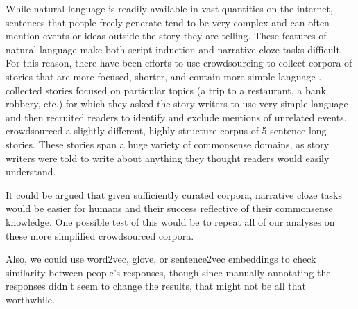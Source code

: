 \documentclass[10pt,a4paper]{article}
\newcommand{\todo}[1]{{\color{red}#1}}
\begin{document}
While natural language is readily available in vast quantities on the internet, sentences that people freely generate tend to be very complex and can often mention events or ideas outside the story they are telling. These features of natural language make both script induction and narrative cloze tasks difficult. For this reason, there have been efforts to use crowdsourcing to collect corpora of stories that are more focused, shorter, and contain more simple language .  collected stories focused on particular topics (a trip to a restaurant, a bank robbery, etc.) for which they asked the story writers to use very simple language and then recruited readers to identify and exclude mentions of unrelated events.  crowdsourced a slightly different, highly structure corpus of 5-sentence-long stories. These stories span a huge variety of commonsense domains, as story writers were told to write about anything they thought readers would easily understand.

It could be argued that given sufficiently curated corpora, narrative cloze tasks would be easier for humans and their success reflective of their commonsense knowledge. One possible test of this would be to repeat all of our analyses on these more simplified crowdsourced corpora.

\todo{Also, we could use word2vec, glove, or sentence2vec embeddings to check similarity between people's responses, though since manually annotating the responses didn't seem to change the results, that might not be all that worthwhile.}





\setlength{\bibleftmargin}{.125in}
\setlength{\bibindent}{-\bibleftmargin}


\end{document}
